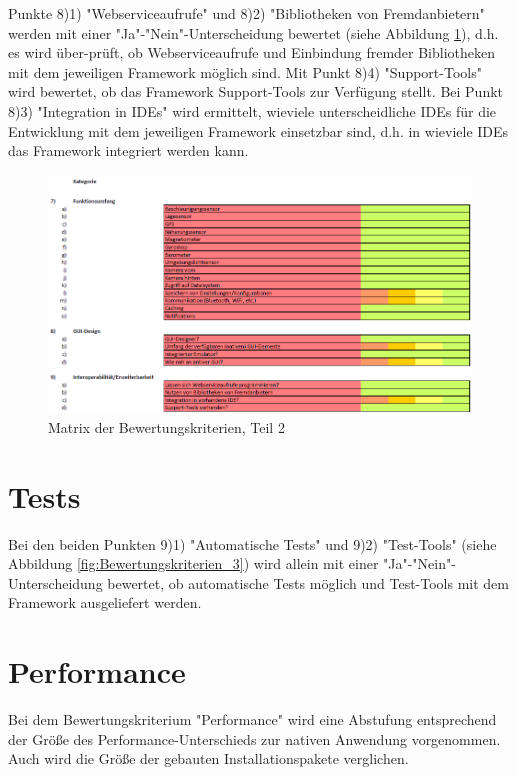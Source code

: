 Punkte 8)1) "Webserviceaufrufe" und 8)2) "Bibliotheken von Fremdanbietern" werden mit einer "Ja"-"Nein"-Unterscheidung bewertet (siehe Abbildung \ref{fig:Bewertungskriterien_2}), d.h. es wird über-prüft, ob Webserviceaufrufe und Einbindung fremder Bibliotheken mit dem jeweiligen Framework möglich sind. Mit Punkt 8)4) "Support-Tools" wird bewertet, ob das Framework Support-Tools zur Verfügung stellt. Bei Punkt 8)3) "Integration in IDEs" wird ermittelt, wieviele unterscheidliche IDEs für die Entwicklung mit dem jeweiligen Framework einsetzbar sind, d.h. in wieviele IDEs das Framework integriert werden kann. 
\clearpage

\begin{figure}[h]
	\centering
	\includegraphics[width=1\textwidth]{Bilder/Bewertungsmatrix_2.PNG}
	\caption{Matrix der Bewertungskriterien, Teil 2}
	\label{fig:Bewertungskriterien_2}
\end{figure}

\section{Tests}

Bei den beiden Punkten 9)1) "Automatische Tests" und 9)2) "Test-Tools" (siehe Abbildung \ref{fig:Bewertungskriterien_3}) wird allein mit einer "Ja"-"Nein"-Unterscheidung bewertet, ob automatische Tests möglich und Test-Tools mit dem Framework ausgeliefert werden. 

\section{Performance}

Bei dem Bewertungskriterium "Performance" wird eine Abstufung entsprechend der Größe des Performance-Unterschieds zur nativen Anwendung vorgenommen. Auch wird die Größe der gebauten Installationspakete verglichen. 

